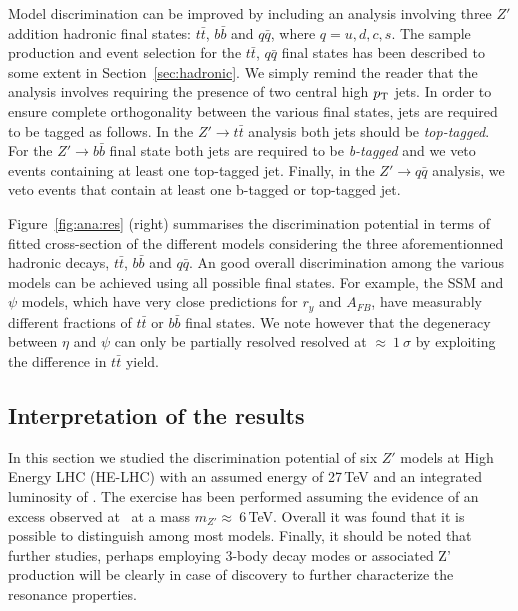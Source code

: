 \documentclass[a4paper,11pt]{article}
\begin{document}
Model discrimination can be improved by including an analysis involving three $Z'$ addition hadronic final states: $t\bar{t}$, $b\bar{b}$ and $q\bar{q}$, where $q=u,d,c,s$. The sample production and event selection for the $t\bar{t}$, $q\bar{q}$ final states has been described to some extent in Section~\ref{sec:hadronic}. We simply remind the reader that the analysis involves requiring the presence of two central high $p_{\text{T}}$ jets. In order to ensure complete orthogonality between the various final states, jets are required to be tagged as follows. In the $Z' \rightarrow t\bar{t}$ analysis both jets should be \emph{top-tagged}. For the $Z' \rightarrow b\bar{b}$ final state both jets are required to be \emph{b-tagged} and we veto events containing at least one top-tagged jet. Finally, in the $Z' \rightarrow q\bar{q}$ analysis, we veto events that contain at least one b-tagged or top-tagged jet.

Figure~\ref{fig:ana:res} (right) summarises the discrimination potential in terms of fitted cross-section of the different models considering the three aforementionned hadronic decays, $t\bar{t}$,  $b\bar{b}$ and $q\bar{q}$. An good overall discrimination among the various models can be achieved using all possible final states. For example, the SSM and $\psi$ models, which have very close predictions for $r_y$ and $A_{FB}$, have measurably different fractions of $t\bar{t}$ or $b\bar{b}$ final states. We note however that the degeneracy between $\eta$ and $\psi$ can only be partially resolved resolved at $\approx~1~\sigma$ by exploiting the difference in $t\bar{t}$ yield.

\subsection{Interpretation of the results}
In this section we studied the discrimination potential of six $Z'$ models at High Energy LHC (HE-LHC) with an assumed \com energy of 27\,TeV and an integrated luminosity of \intlumihelhc. The exercise has been performed assuming the evidence of an excess observed at \sqrtslhc\ at a mass $m_{Z'}\approx~6$\,TeV. Overall it was found that it is possible to distinguish among most models. Finally, it should be noted that further studies, perhaps employing 3-body decay modes or associated Z' production will be clearly in case of discovery to further characterize the resonance properties.
\end{document}
